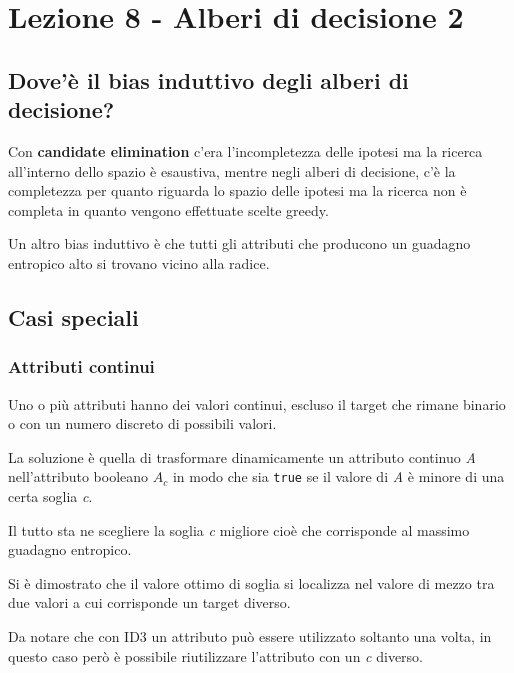 \section{Lezione 8 - Alberi di decisione 2}\label{lezione-8---alberi-di-decisione-2}

\subsection{Dove'è il bias induttivo degli alberi di decisione?}\label{doveuxe8-il-bias-induttivo-degli-alberi-di-decisione}

Con \textbf{candidate elimination} c'era l'incompletezza delle ipotesi
ma la ricerca all'interno dello spazio è esaustiva, mentre negli alberi
di decisione, c'è la completezza per quanto riguarda lo spazio delle
ipotesi ma la ricerca non è completa in quanto vengono effettuate scelte
greedy.

Un altro bias induttivo è che tutti gli attributi che producono un
guadagno entropico alto si trovano vicino alla radice.

\subsection{Casi speciali}\label{casi-speciali}

\subsubsection{Attributi continui}\label{attributi-continui}

Uno o più attributi hanno dei valori continui, escluso il target che
rimane binario o con un numero discreto di possibili valori.

La soluzione è quella di trasformare dinamicamente un attributo continuo
\emph{A} nell'attributo booleano $A_c$ in modo che sia \texttt{true} se il
valore di \emph{A} è minore di una certa soglia \emph{c}.

Il tutto sta ne scegliere la soglia \emph{c} migliore cioè che
corrisponde al massimo guadagno entropico.

Si è dimostrato che il valore ottimo di soglia si localizza nel valore
di mezzo tra due valori a cui corrisponde un target diverso.

Da notare che con ID3 un attributo può essere utilizzato soltanto una
volta, in questo caso però è possibile riutilizzare l'attributo con un
\emph{c} diverso.

